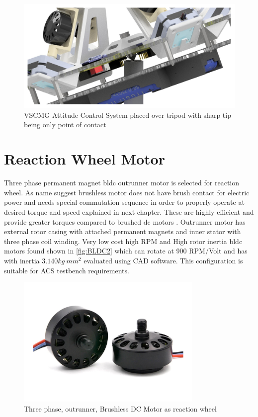 \begin{figure}[ht]
    \centering
    \includegraphics[width=\textwidth]{figures/Assembly/AssemblyACRPivote.pdf}
    \caption{VSCMG Attitude Control System placed over tripod with sharp tip being only point of contact}
    \label{fig:my_AssemblyACRPivote}
\end{figure}

\section{Reaction Wheel Motor}
Three phase permanent magnet \acrfull{bldc} outrunner motor is selected for reaction wheel. As name suggest brushless motor does not have brush contact for electric power and needs special commutation sequence in order to properly operate at desired torque and speed explained in next chapter. These are highly efficient and provide greater torques compared to brushed dc motors \cite{bldc}. Outrunner motor has external rotor casing with attached permanent magnets and inner stator with three phase coil winding. Very low cost high RPM and High rotor inertia \acrshort{bldc} motors found shown in \autoref{fig:BLDC2} which can rotate at 900 RPM/Volt and has with inertia $3.140 kg \ mm^2$ evaluated using CAD software. This configuration is suitable for ACS testbench requirements.
\begin{figure}[ht]
    \centering
    \includegraphics[width=0.80\textwidth]{figures/Assembly/BLDC2.pdf}
    \caption{Three phase, outrunner, Brushless DC Motor as reaction wheel}
    \label{fig:BLDC2}
\end{figure}

